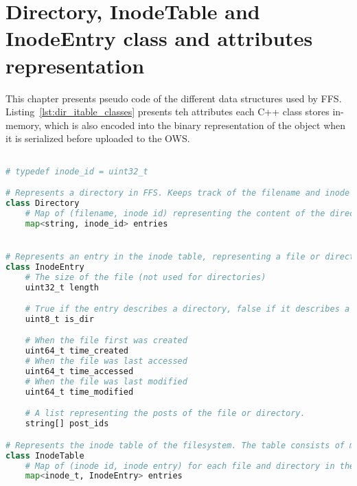 \chapter{Directory, InodeTable and InodeEntry class and attributes representation}
This chapter presents pseudo code of the different data structures used by FFS. Listing~\ref{lst:dir_itable_classes} presents teh attributes each C++ class stores in-memory, which is also encoded into the binary representation of the object when it is serialized before uploaded to the OWS.

\label{app:inode_dir_code}
\begin{lstlisting}[language=python, caption={The attributes classes representing directories and the inode table in FFS}, label=lst:dir_itable_classes,breaklines=true]

# typedef inode_id = uint32_t

# Represents a directory in FFS. Keeps track of the filename and inode of each file
class Directory
	# Map of (filename, inode id) representing the content of the directory
	map<string, inode_id> entries


# Represents an entry in the inode table, representing a file or directory
class InodeEntry
	# The size of the file (not used for directories) 
	uint32_t length

	# True if the entry describes a directory, false if it describes a file
	uint8_t is_dir

	# When the file first was created
	uint64_t time_created
	# When the file was last accessed
	uint64_t time_accessed
	# When the file was last modified
	uint64_t time_modified

	# A list representing the posts of the file or directory. 
	string[] post_ids

# Represents the inode table of the filesystem. The table consists of multiple inode entries
class InodeTable
	# Map of (inode id, inode entry) for each file and directory in the filesystem
	map<inode_t, InodeEntry> entries

\end{lstlisting}